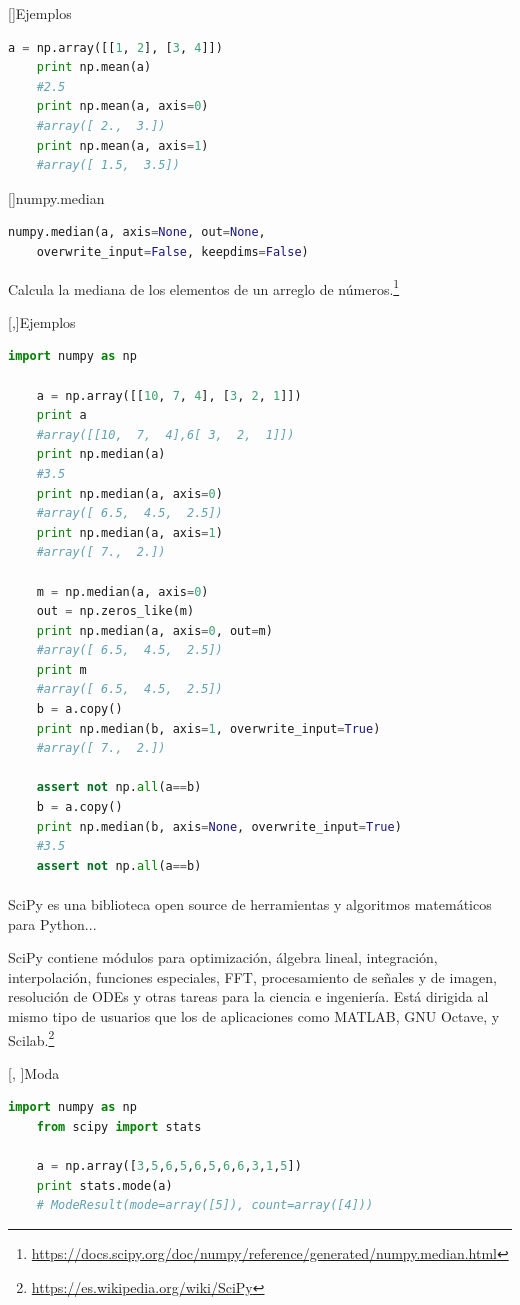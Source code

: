 []{Ejemplos}
\begin{lstlisting}[language=Python]
	a = np.array([[1, 2], [3, 4]])
	print np.mean(a)
	#2.5
	print np.mean(a, axis=0)
	#array([ 2.,  3.])
	print np.mean(a, axis=1)
	#array([ 1.5,  3.5])
\end{lstlisting}


[]{numpy.median}
\begin{lstlisting}[language=Python]
	numpy.median(a, axis=None, out=None,
	overwrite_input=False, keepdims=False)
\end{lstlisting}

Calcula la mediana de los elementos de un arreglo de números.\footnote{\href{https://docs.scipy.org/doc/numpy/reference/generated/numpy.median.html}{https://docs.scipy.org/doc/numpy/reference/generated/numpy.median.html}}


[,]{Ejemplos}
\begin{lstlisting}[language=Python]
	import numpy as np
	
	a = np.array([[10, 7, 4], [3, 2, 1]])
	print a
	#array([[10,  7,  4],6[ 3,  2,  1]])
	print np.median(a)
	#3.5
	print np.median(a, axis=0)
	#array([ 6.5,  4.5,  2.5])
	print np.median(a, axis=1)
	#array([ 7.,  2.])
	
	m = np.median(a, axis=0)
	out = np.zeros_like(m)
	print np.median(a, axis=0, out=m)
	#array([ 6.5,  4.5,  2.5])
	print m
	#array([ 6.5,  4.5,  2.5])
	b = a.copy()
	print np.median(b, axis=1, overwrite_input=True)
	#array([ 7.,  2.])
	
	assert not np.all(a==b)
	b = a.copy()
	print np.median(b, axis=None, overwrite_input=True)
	#3.5
	assert not np.all(a==b)
\end{lstlisting}


\paragraph{}
SciPy es una biblioteca open source de herramientas y algoritmos matemáticos para Python...

SciPy contiene módulos para optimización, álgebra lineal, integración, interpolación, funciones especiales, FFT, procesamiento de señales y de imagen, resolución de ODEs y otras tareas para la ciencia e ingeniería. Está dirigida al mismo tipo de usuarios que los de aplicaciones como MATLAB, GNU Octave, y Scilab.\footnote{\href{https://es.wikipedia.org/wiki/SciPy}{https://es.wikipedia.org/wiki/SciPy}}

[, ]{Moda}
\begin{lstlisting}[language=Python]
	import numpy as np
	from scipy import stats
	
	a = np.array([3,5,6,5,6,5,6,6,3,1,5])
	print stats.mode(a)
	# ModeResult(mode=array([5]), count=array([4]))
\end{lstlisting}

